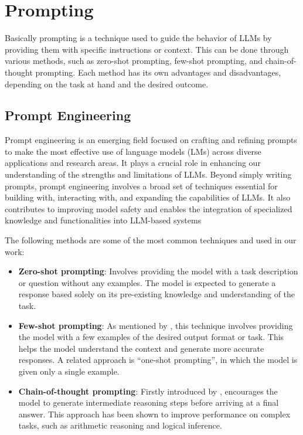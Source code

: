 \section{Prompting}

Basically prompting is a technique used to guide the behavior of LLMs by providing them with specific instructions or context. 
This can be done through various methods, such as zero-shot prompting, few-shot prompting, and chain-of-thought prompting. 
Each method has its own advantages and disadvantages, depending on the task at hand and the desired outcome.


\subsection{Prompt Engineering}

Prompt engineering is an emerging field focused on crafting and refining prompts to make the most effective use of language models (LMs) 
across diverse applications and research areas. It plays a crucial role in enhancing our understanding of the strengths and limitations of LLMs. 
Beyond simply writing prompts, prompt engineering involves a broad set of techniques essential for building with, interacting with, and expanding the capabilities of LLMs. 
It also contributes to improving model safety and enables the integration of specialized knowledge and functionalities into LLM-based systems

The following methods are some of the most common techniques and used in our work:

\begin{itemize}
    \item \textbf{Zero-shot prompting}: Involves providing the model with a task description or question without any examples. The model is expected to generate a response based solely on its pre-existing knowledge and understanding of the task.
    \item \textbf{Few-shot prompting}: As mentioned by \cite{gpt3Paper}, this technique involves providing the model with a few examples of the desired output format or task. This helps the model understand the context and generate more accurate responses. A related approach is ``one-shot prompting'', in which the model is given only a single example.
    \item \textbf{Chain-of-thought prompting}: Firstly introduced by \cite{chainofthought2023}, encourages the model to generate intermediate reasoning steps before arriving at a final answer. This approach has been shown to improve performance on complex tasks, such as arithmetic reasoning and logical inference.
\end{itemize}





